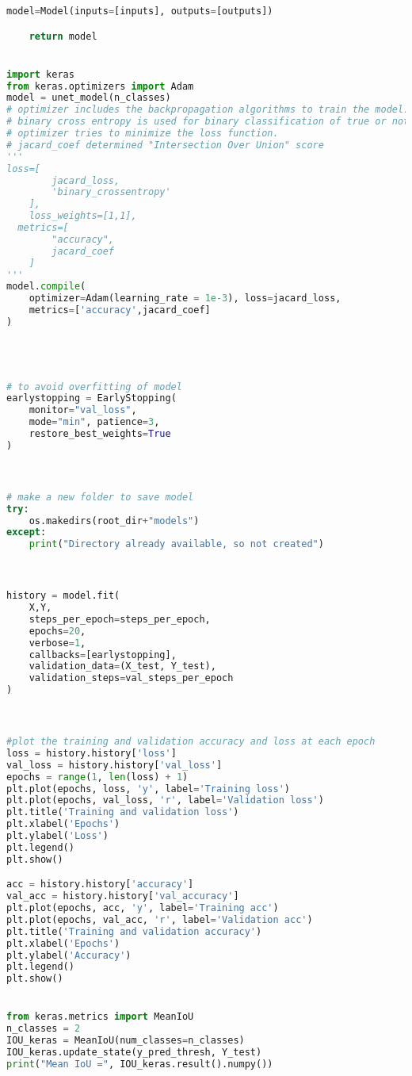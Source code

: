 \begin{lstlisting}[language=Python]
    model=Model(inputs=[inputs], outputs=[outputs])

    return model


import keras
from keras.optimizers import Adam
model = unet_model(n_classes)
# optimizer includes the backpropagation algorithms to train the model.
# binary cross entropy is used for binary classification of true or not true situations in segmentaiton.
# optimizer tries to minimize the loss function.
# jacard_coef determined "Intersection Over Union" score
'''
loss=[
        jacard_loss,
        'binary_crossentropy'
    ],
    loss_weights=[1,1],
  metrics=[
        "accuracy", 
        jacard_coef
    ]
'''
model.compile(
    optimizer=Adam(learning_rate = 1e-3), loss=jacard_loss, 
    metrics=['accuracy',jacard_coef]
)




# to avoid overfitting of model
earlystopping = EarlyStopping(
    monitor="val_loss", 
    mode="min", patience=3, 
    restore_best_weights=True
)



# make a new folder to save model
try:
    os.makedirs(root_dir+"models")
except:
    print("Directory already available, so not created")



history = model.fit(
    X,Y,
    steps_per_epoch=steps_per_epoch, 
    epochs=20, 
    verbose=1,
    callbacks=[earlystopping],
    validation_data=(X_test, Y_test),
    validation_steps=val_steps_per_epoch
)



#plot the training and validation accuracy and loss at each epoch
loss = history.history['loss']
val_loss = history.history['val_loss']
epochs = range(1, len(loss) + 1)
plt.plot(epochs, loss, 'y', label='Training loss')
plt.plot(epochs, val_loss, 'r', label='Validation loss')
plt.title('Training and validation loss')
plt.xlabel('Epochs')
plt.ylabel('Loss')
plt.legend()
plt.show()

acc = history.history['accuracy']
val_acc = history.history['val_accuracy']
plt.plot(epochs, acc, 'y', label='Training acc')
plt.plot(epochs, val_acc, 'r', label='Validation acc')
plt.title('Training and validation accuracy')
plt.xlabel('Epochs')
plt.ylabel('Accuracy')
plt.legend()
plt.show()


from keras.metrics import MeanIoU
n_classes = 2
IOU_keras = MeanIoU(num_classes=n_classes)  
IOU_keras.update_state(y_pred_thresh, Y_test)
print("Mean IoU =", IOU_keras.result().numpy())





\end{lstlisting}
